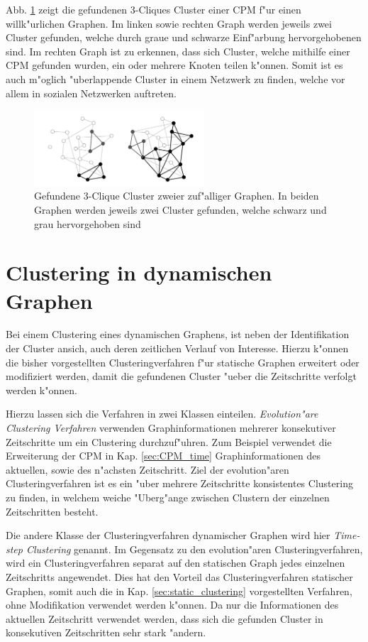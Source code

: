 \documentclass[journal]{vgtc}
\begin{document}
    Abb. \ref{fig:CPM} zeigt die gefundenen 3-Cliques Cluster einer CPM f"ur einen willk"urlichen Graphen.
    Im linken sowie rechten Graph werden jeweils zwei Cluster gefunden, welche durch graue und schwarze
    Einf"arbung hervorgehobenen sind. Im rechten Graph ist zu erkennen, dass sich Cluster, welche mithilfe einer
    CPM gefunden wurden, ein oder mehrere Knoten teilen k"onnen. Somit ist es auch m"oglich "uberlappende Cluster
    in einem Netzwerk zu finden, welche vor allem in sozialen Netzwerken auftreten.
    \begin{figure}[h]
     \centering
     \includegraphics[width=2.5in]{images/k-cliques}
     \caption{\label{fig:CPM} Gefundene 3-Clique Cluster zweier zuf"alliger Graphen. In beiden Graphen werden jeweils zwei
		Cluster gefunden, welche schwarz und grau hervorgehoben sind \cite{CPM}}
    \end{figure}


\section{Clustering in dynamischen Graphen}
  \label{sec:dynamic_clustering}
  Bei einem Clustering eines dynamischen Graphens, ist neben der Identifikation der Cluster ansich, auch deren
  zeitlichen Verlauf von Interesse. Hierzu k"onnen die bisher vorgestellten Clusteringverfahren f"ur statische
  Graphen erweitert oder modifiziert werden, damit die gefundenen Cluster "ueber die Zeitschritte verfolgt werden
  k"onnen.
  
  Hierzu lassen sich die Verfahren in zwei Klassen einteilen. \emph{Evolution"are Clustering Verfahren}\cite{evolutionary_clustering}
  verwenden Graphinformationen mehrerer konsekutiver Zeitschritte um ein Clustering durchzuf"uhren. Zum Beispiel verwendet die Erweiterung der CPM
  in Kap. \ref{sec:CPM_time} Graphinformationen des aktuellen, sowie des n"achsten Zeitschritt. Ziel der evolution"aren Clusteringverfahren
  ist es ein "uber mehrere Zeitschritte konsistentes Clustering zu finden, in welchem weiche "Uberg"ange zwischen Clustern der einzelnen Zeitschritten
  besteht.
  
  Die andere Klasse der Clusteringverfahren dynamischer Graphen wird hier \emph{Time-step Clustering} genannt. Im Gegensatz zu den evolution"aren
  Clusteringverfahren, wird ein Clusteringverfahren separat auf den statischen Graph jedes einzelnen Zeitschritts angewendet. Dies hat den Vorteil das
  Clusteringverfahren statischer Graphen, somit auch die in Kap. \ref{sec:static_clustering} vorgestellten Verfahren, ohne Modifikation
  verwendet werden k"onnen. Da nur die Informationen des aktuellen Zeitschritt verwendet werden, dass sich die gefunden Cluster in konsekutiven
  Zeitschritten sehr stark "andern.
  
\end{document}

